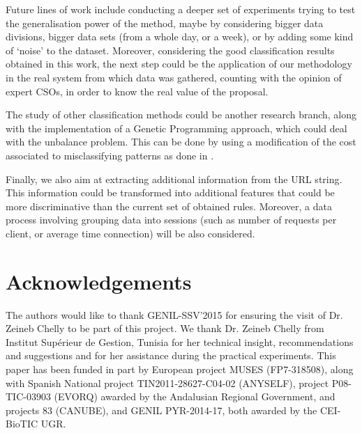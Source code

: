 \documentclass{llncs}
\begin{document}
Future lines of work include conducting a deeper set of experiments trying to test the generalisation power of the method,
maybe by considering bigger data divisions, bigger data sets (from a whole day, or a week), or by adding some kind
of `noise' to the dataset.
Moreover, considering the good classification results obtained in this work, the next step could be the application
of our methodology in the real system from which data was gathered, counting with the opinion of expert CSOs, in order
to know the real value of the proposal.

The study of other classification methods could be another research branch, along with the implementation of a Genetic
Programming approach, which could deal with the unbalance problem. This can be done by using a modification of the
cost associated to misclassifying patterns as done  in \cite{cost_adjustment_07}.

Finally, we also aim at extracting additional information from the URL string. This information could be transformed
into additional features that could be more discriminative than the current set of obtained rules. Moreover, a data
process involving grouping data into sessions (such as number of requests per client, or average time connection)
will be also considered.


\section*{Acknowledgements}
The authors would like to thank GENIL-SSV'2015 for ensuring the visit of Dr. Zeineb Chelly to be part of this project.  We thank Dr. Zeineb Chelly from Institut Sup\'erieur de Gestion, Tunisia for her technical insight, recommendations and suggestions and for her assistance during the practical experiments. This paper has been funded in part by European project MUSES (FP7-318508), along with Spanish National project TIN2011-28627-C04-02 (ANYSELF), project P08-TIC-03903 (EVORQ) awarded by the Andalusian Regional Government, and projects 83 (CANUBE), and GENIL PYR-2014-17, both awarded by the CEI-BioTIC UGR.



\end{document}
